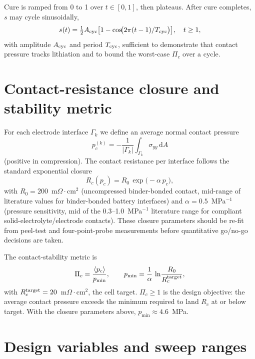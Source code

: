 \documentclass[11pt,letterpaper]{article}
\begin{document}
Cure is ramped from 0 to 1 over $t \in [0, 1]$, then plateaus.  After
cure completes, $s$ may cycle sinusoidally,
\begin{equation}
s(t) = \tfrac{1}{2}A_{\rm cyc} \bigl[1 - \cos\!\bigl(2\pi(t-1)/T_{\rm cyc}\bigr)\bigr],
\quad t \ge 1,
\end{equation}
with amplitude $A_{\rm cyc}$ and period $T_{\rm cyc}$, sufficient to
demonstrate that contact pressure tracks lithiation and to bound the
worst-case $\Pi_c$ over a cycle.

\section{Contact-resistance closure and stability metric}

For each electrode interface $\Gamma_k$ we define an average normal
contact pressure
\begin{equation}
p_c^{(k)} = - \frac{1}{|\Gamma_k|} \int_{\Gamma_k} \sigma_{yy}\,\mathrm{d}A
\end{equation}
(positive in compression).  The contact resistance per interface
follows the standard exponential closure
\begin{equation}
R_c(p_c) = R_0 \, \exp\!\bigl(-\alpha\, p_c\bigr),
\label{eq:Rc}
\end{equation}
with $R_0 = 200$~m$\Omega\cdot$cm$^2$ (uncompressed binder-bonded
contact, mid-range of literature values for binder-bonded battery
interfaces) and $\alpha = 0.5$~MPa$^{-1}$ (pressure sensitivity, mid of
the 0.3--1.0~MPa$^{-1}$ literature range for compliant
solid-electrolyte/electrode contacts).  These closure parameters
should be re-fit from peel-test and four-point-probe measurements
before quantitative go/no-go decisions are taken.

The contact-stability metric is
\begin{equation}
\Pi_c = \frac{\langle p_c \rangle}{p_{\min}},
\qquad p_{\min} = \frac{1}{\alpha}\,\ln\!\frac{R_0}{R_c^{\rm target}},
\label{eq:Pic}
\end{equation}
with $R_c^{\rm target} = 20$~m$\Omega\cdot$cm$^2$, the cell target.
$\Pi_c \ge 1$ is the design objective: the average contact pressure
exceeds the minimum required to land $R_c$ at or below target.  With
the closure parameters above, $p_{\min} \approx 4.6$~MPa.

\section{Design variables and sweep ranges}
\label{sec:design}
\end{document}
